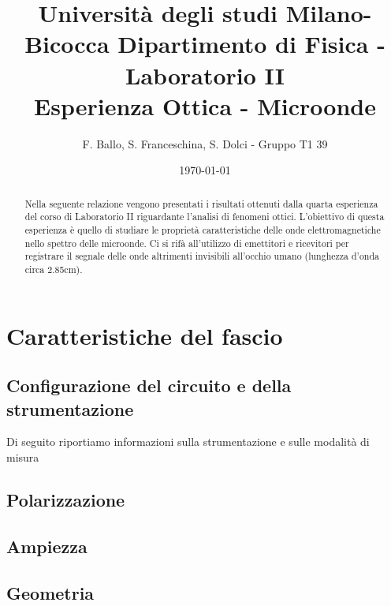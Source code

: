 \documentclass[letterpaper,12pt]{article}
\begin{document}
\title{{\small Università degli studi Milano-Bicocca  Dipartimento di Fisica - Laboratorio II }\\
    Esperienza Ottica - Microonde}
\author{F. Ballo, S. Franceschina, S. Dolci - Gruppo T1 39}
\date{\today}
\maketitle
\thispagestyle{logoheader}


\begin{abstract}
Nella seguente relazione vengono presentati i risultati ottenuti dalla quarta esperienza del corso di Laboratorio II riguardante l'analisi di fenomeni ottici. L'obiettivo di questa esperienza è quello di studiare le proprietà caratteristiche delle onde elettromagnetiche nello spettro delle microonde. Ci si rifà all'utilizzo di emettitori e ricevitori per registrare il segnale delle onde altrimenti invisibili all'occhio umano (lunghezza d'onda circa 2.85cm).  
\begin{adjustwidth}{-1cm}{-1cm}
\end{adjustwidth}
\end{abstract}
\tableofcontents
\newpage

\section{Caratteristiche del fascio}

\subsection{Configurazione del circuito e della strumentazione}
Di seguito riportiamo informazioni sulla strumentazione e sulle modalità di misura

\subsection{Polarizzazione}



\subsection{Ampiezza} 



\subsection{Geometria}
\end{document}
